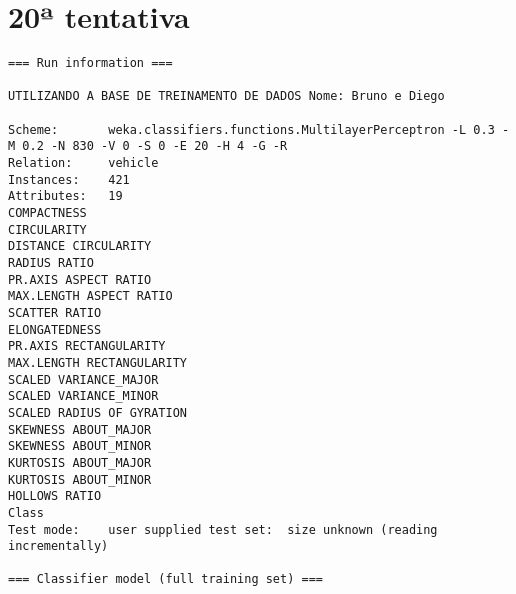 \documentclass[
	article,			%
	11pt,				%
	oneside,			%
	a4paper,			%
	english,			%
	brazil,				%
	sumario=tradicional
	]{abntex2}
\begin{document}
\section{20ª tentativa}

\begin{lstlisting}
=== Run information ===

UTILIZANDO A BASE DE TREINAMENTO DE DADOS Nome: Bruno e Diego

Scheme:       weka.classifiers.functions.MultilayerPerceptron -L 0.3 -M 0.2 -N 830 -V 0 -S 0 -E 20 -H 4 -G -R
Relation:     vehicle
Instances:    421
Attributes:   19
COMPACTNESS
CIRCULARITY
DISTANCE CIRCULARITY
RADIUS RATIO
PR.AXIS ASPECT RATIO
MAX.LENGTH ASPECT RATIO
SCATTER RATIO
ELONGATEDNESS
PR.AXIS RECTANGULARITY
MAX.LENGTH RECTANGULARITY
SCALED VARIANCE_MAJOR
SCALED VARIANCE_MINOR
SCALED RADIUS OF GYRATION
SKEWNESS ABOUT_MAJOR
SKEWNESS ABOUT_MINOR
KURTOSIS ABOUT_MAJOR
KURTOSIS ABOUT_MINOR
HOLLOWS RATIO
Class
Test mode:    user supplied test set:  size unknown (reading incrementally)

=== Classifier model (full training set) ===


\end{lstlisting}
\end{document}
